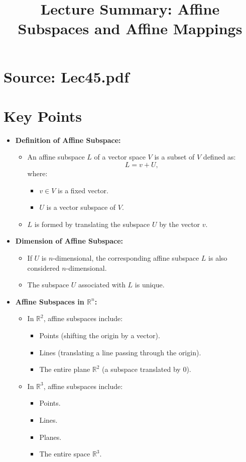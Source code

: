 \documentclass{article}
\title{Lecture Summary: Affine Subspaces and Affine Mappings}
\author{}
\date{}
\begin{document}
\maketitle

\section*{Source: Lec45.pdf}

\section*{Key Points}

\begin{itemize}
  \item \textbf{Definition of Affine Subspace:}
    \begin{itemize}
      \item An affine subspace $L$ of a vector space $V$ is a subset of $V$ defined as:
        \[
          L = v + U,
        \]
        where:
        \begin{itemize}
          \item $v \in V$ is a fixed vector.
          \item $U$ is a vector subspace of $V$.
        \end{itemize}
      \item $L$ is formed by translating the subspace $U$ by the vector $v$.
    \end{itemize}

  \item \textbf{Dimension of Affine Subspace:}
    \begin{itemize}
      \item If $U$ is $n$-dimensional, the corresponding affine subspace $L$ is also considered $n$-dimensional.
      \item The subspace $U$ associated with $L$ is unique.
    \end{itemize}

  \item \textbf{Affine Subspaces in $\mathbb{R}^n$:}
    \begin{itemize}
      \item In $\mathbb{R}^2$, affine subspaces include:
        \begin{itemize}
          \item Points (shifting the origin by a vector).
          \item Lines (translating a line passing through the origin).
          \item The entire plane $\mathbb{R}^2$ (a subspace translated by 0).
        \end{itemize}
      \item In $\mathbb{R}^3$, affine subspaces include:
        \begin{itemize}
          \item Points.
          \item Lines.
          \item Planes.
          \item The entire space $\mathbb{R}^3$.
        \end{itemize}
    \end{itemize}


\end{itemize}
\end{document}
